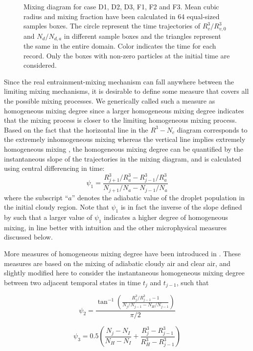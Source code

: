\begin{figure}[!htbp]
\caption{Mixing diagram for case D1, D2, D3, F1, F2 and F3. Mean cubic radius
and mixing fraction have been calculated in 64 equal-sized samples boxes. The
circle represent the time trajectories of $R_v^3/R_{v,0}^3$ and $N_d/N_{d,a}$
in different sample boxes and the triangles represent the same in the entire
domain. Color indicates the time for each record. Only the boxes with non-zero
particles at the initial time are considered.}
\label{fig:mixing_diagram}
\end{figure}

Since the real entrainment-mixing mechanism can fall anywhere between the limiting mixing mechanisms, it is desirable to define some measure that covers all the possible mixing processes. We generically called such a measure as homogeneous mixing degree since a larger homogeneous mixing degree indicates that the mixing process is closer to the limiting homogeneous mixing process. Based on the fact that the horizontal line in the $R^3−N_c$ diagram corresponds to the extremely inhomogeneous mixing whereas the vertical line implies extremely homogeneous mixing \cite{And09}, the homogeneous mixing degree can be quantified by the instantaneous slope of the trajectories in the mixing diagram, and is calculated using central differencing in time: 
\begin{equation}
\psi_1 = \frac{R_{j+1}^3/R_a^3 - R_{j-1}^3/R_a^3}{N_{j+1}/N_a - N_{j-1}/N_a}
\label{phi0}
\end{equation}
where the subscript ``$a$'' denotes the adiabatic value of the droplet population in the initial cloudy region. Note that $\psi_1$ is in fact the inverse of the slope defined by \cite{And09} such that a larger value of $\psi_1$ indicates a higher degree of homogeneous mixing, in line better with intuition and the other microphysical measures discussed below.

More measures of homogeneous mixing degree have been introduced in \cite{Lu2011, Lu2014}. 
These measures are based on the mixing of adiabatic cloudy air and clear air, and slightly 
modified here to consider the instantaneous homogeneous mixing degree between two adjacent 
temporal states in time $t_j$ and $t_{j-1}$, such that
  
\begin{equation}
\psi_2 = \frac{\tan^{-1}(\frac{R_{j}^3/R_{j-1}^3 - 1}{N_j/N_{j-1} - N_H/N_{j-1}})}{\pi/2}
\label{phi1}
\end{equation}

\begin{equation}
\psi_3 = 0.5(\frac{N_j-N_{I}}{N_H-N_I} + \frac{R_j^3-R_{j-1}^3}{R_H^3 - R_{j-1}^3})
\label{phi2}
\end{equation}

